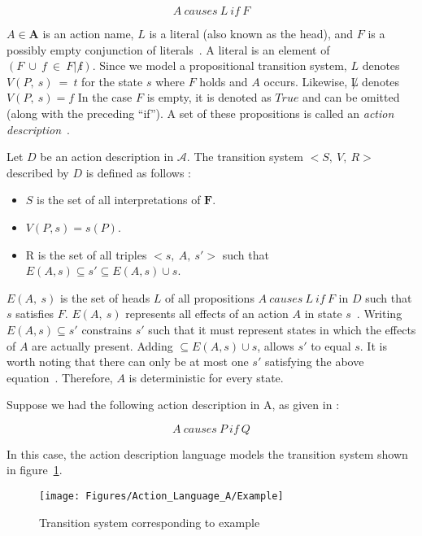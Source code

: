 $$
A\ causes\ L\ if\ F
$$

$ A \in \boldsymbol{A} $ is an action name, $ L $ is a literal (also known as the head), and $ F $ is a possibly empty conjunction of literals~\cite{gelfond_action_1998}.
A literal is an element of $(F\ \cup\ {f\ \in\ F |\ \not f})$.
Since we model a propositional transition system, $L$ denotes $V(P,\ s)\ =\ t$ for the state $s$ where $F$ holds and $A$ occurs.
Likewise, $\not L$ denotes $V(P,\ s)=f$
In the case $ F $ is empty, it is denoted as $ True $ and can be omitted (along with the preceding ``if'').
A set of these propositions is called an \textit{action description}~\cite{gelfond_action_1998}.

\begin{definition}
    Let $ D $ be an action description in $ \mathcal{A} $.
    The transition system $ <S,\ V,\ R> $ described by $ D $ is defined as follows \cite{gelfond_action_1998}:

    \begin{itemize}
        \item $ S $ is the set of all interpretations of $ \boldsymbol{F} $.
        \item $ V(P, s) = s(P) $.
        \item R is the set of all triples $ <s,\ A,\ s'> $ such that $ E(A,s) \subseteq s' \subseteq E(A,s) \cup s $.
    \end{itemize}
\end{definition}

$ E(A,\ s) $ is the set of heads $ L $ of all propositions $ A\ causes\ L\ if\ F $ in $ D $ such that $ s $ satisfies $ F $.
$ E(A,\ s) $ represents all effects of an action $ A $ in state $ s $~\cite{gelfond_action_1998}.
Writing $ E\left(A,s\right)\subseteq s' $ constrains $ s' $ such that it must represent states in which the effects of $ A $ are actually present.
Adding $ \subseteq E\left(A,s\right)\cup s $, allows $ s' $ to equal $ s $.
It is worth noting that there can only be at most one $ s' $ satisfying the above equation~\cite{gelfond_action_1998}.
Therefore, $ A $ is deterministic for every state.

Suppose we had the following action description in A, as given in \cite{gelfond_action_1998}:

$$
A\ causes\ P\ if\ Q
$$

In this case, the action description language models the transition system shown in figure~\ref{fig:action_language_a_example}.

\begin{figure}[h]
    \centering
    \texttt{[image: Figures/Action\_Language\_A/Example]}
    \caption{Transition system corresponding to example}
    \label{fig:action_language_a_example}
\end{figure}

